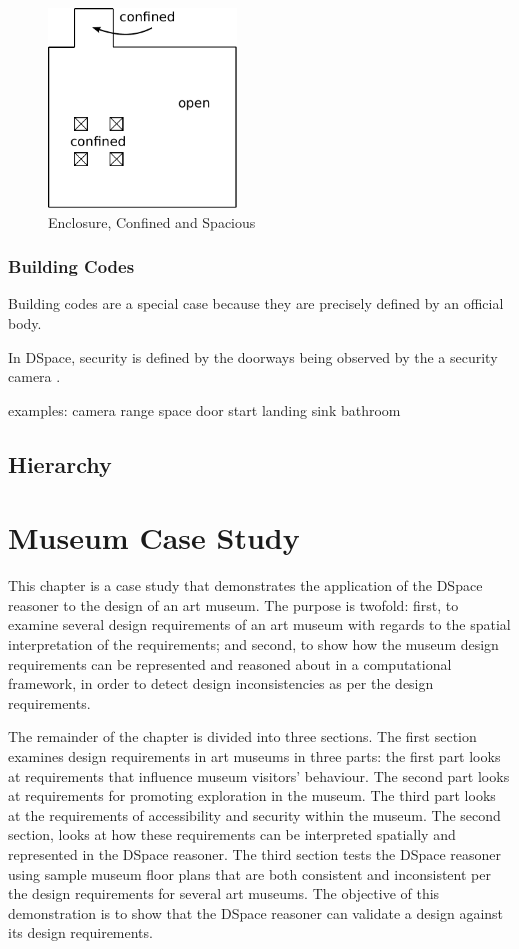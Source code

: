 \documentclass[12pt]{ucthesis}
\begin{document}
\begin{figure}[H]
\centering
\includegraphics[width=50mm]{spacious-confined}
\caption{Enclosure, Confined and Spacious}
\label{enclosure}
\end{figure}


\subsection{Building Codes}
Building codes are a special case because they are precisely defined by an official body. 
 
In DSpace, security is defined by the doorways being observed by the a security camera \cite{Bhatt}. 

examples: camera range space door
          start landing
          sink bathroom
          


\section{Hierarchy}



\chapter{Museum Case Study}
This chapter is a case study that demonstrates the application of the DSpace reasoner to the design of an art museum. The purpose is twofold: first, to examine several design requirements of an art museum with regards to the spatial interpretation of the requirements; and second, to show how the museum design requirements can be represented and reasoned about in a computational framework, in order to detect design inconsistencies as per the design requirements.

The remainder of the chapter is divided into three sections. The first section examines design requirements in art museums in three parts: the first part looks at requirements that influence museum visitors' behaviour. The second part looks at requirements for promoting exploration in the museum. The third part looks at the requirements of accessibility and security within the museum. The second section, looks at how these requirements can be interpreted spatially and represented in the DSpace reasoner. The third section tests the DSpace reasoner using sample museum floor plans that are both consistent and inconsistent per the design requirements for several art museums. The objective of this demonstration is to show that the DSpace reasoner can validate a design against its design requirements.
\end{document}
